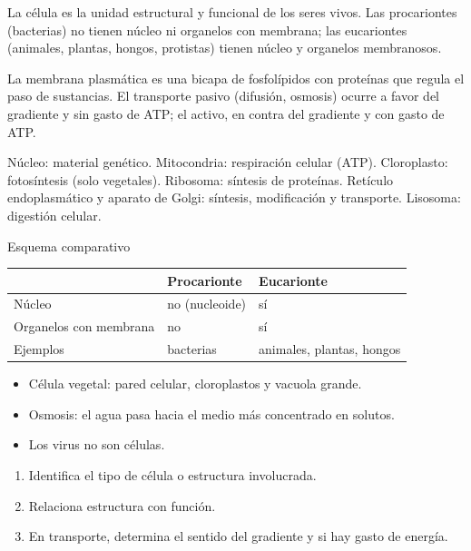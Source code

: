 \documentclass[10pt,a4paper,twocolumn]{article}
\begin{document}
La célula es la unidad estructural y funcional de los seres vivos. Las procariontes (bacterias) no tienen núcleo ni organelos con membrana; las eucariontes (animales, plantas, hongos, protistas) tienen núcleo y organelos membranosos.

La membrana plasmática es una bicapa de fosfolípidos con proteínas que regula el paso de sustancias. El transporte pasivo (difusión, osmosis) ocurre a favor del gradiente y sin gasto de ATP; el activo, en contra del gradiente y con gasto de ATP.

\begin{mecanismo}
Núcleo: material genético. Mitocondria: respiración celular (ATP). Cloroplasto: fotosíntesis (solo vegetales). Ribosoma: síntesis de proteínas. Retículo endoplasmático y aparato de Golgi: síntesis, modificación y transporte. Lisosoma: digestión celular.
\end{mecanismo}

{\sffamily\footnotesize\color{zinc500} Esquema comparativo}
\begin{center}\small
\begin{tabular}{@{}>{\raggedright\arraybackslash}p{\dimexpr(\linewidth-4\tabcolsep)/3\relax}>{\raggedright\arraybackslash}p{\dimexpr(\linewidth-4\tabcolsep)/3\relax}>{\raggedright\arraybackslash}p{\dimexpr(\linewidth-4\tabcolsep)/3\relax}@{}}
\toprule
 & \textbf{Procarionte} & \textbf{Eucarionte} \\
\midrule
Núcleo & no (nucleoide) & sí \\
Organelos con membrana & no & sí \\
Ejemplos & bacterias & animales, plantas, hongos \\
\bottomrule
\end{tabular}
\end{center}

\begin{ideasclave}
\begin{itemize}
  \item Célula vegetal: pared celular, cloroplastos y vacuola grande.
  \item Osmosis: el agua pasa hacia el medio más concentrado en solutos.
  \item Los virus no son células.
\end{itemize}
\end{ideasclave}

\begin{metodo}
\begin{enumerate}
  \item Identifica el tipo de célula o estructura involucrada.
  \item Relaciona estructura con función.
  \item En transporte, determina el sentido del gradiente y si hay gasto de energía.
\end{enumerate}
\end{metodo}
\end{document}

